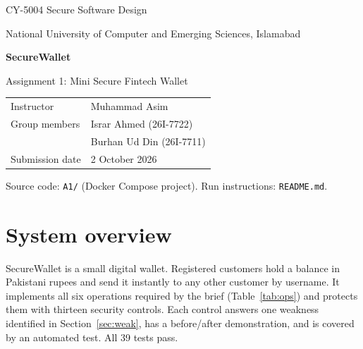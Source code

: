 \documentclass[11pt,a4paper]{article}
\newcommand{\numtests}{39}
\newcommand{\code}[1]{\texttt{#1}}
\begin{document}
\begin{titlepage}
\centering
\vspace*{2.5cm}
{\Large CY-5004 Secure Software Design\par}
\vspace{0.4cm}
{\large National University of Computer and Emerging Sciences, Islamabad\par}
\vspace{2cm}
{\Huge\bfseries SecureWallet\par}
\vspace{0.4cm}
{\Large Assignment 1: Mini Secure Fintech Wallet\par}
\vspace{2cm}
\begin{tabular}{ll}
\toprule
Instructor & Muhammad Asim \\
Group members & Israr Ahmed (26I-7722) \\
 & Burhan Ud Din (26I-7711) \\
Submission date & 2 October 2026 \\
\bottomrule
\end{tabular}
\vfill
{\small Source code: \code{A1/} (Docker Compose project). Run instructions: \code{README.md}.\par}
\end{titlepage}

\tableofcontents
\newpage

\section{System overview}

SecureWallet is a small digital wallet. Registered customers hold a balance in Pakistani rupees and send it instantly to any other customer by username. It implements all six operations required by the brief (Table~\ref{tab:ops}) and protects them with thirteen security controls. Each control answers one weakness identified in Section~\ref{sec:weak}, has a before/after demonstration, and is covered by an automated test. All \numtests{} tests pass.
\end{document}
